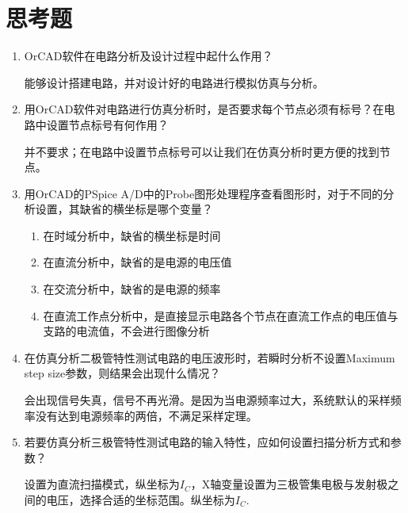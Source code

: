 \documentclass{../source/Experiment}
\begin{document}
    \section{思考题}
            \begin{enumerate}
                \item OrCAD软件在电路分析及设计过程中起什么作用？\par
                能够设计搭建电路，并对设计好的电路进行模拟仿真与分析。
                \item 用OrCAD软件对电路进行仿真分析时，是否要求每个节点必须有标号？在电路中设置节点标号有何作用？\par
                并不要求；在电路中设置节点标号可以让我们在仿真分析时更方便的找到节点。
                \item 用OrCAD的PSpice A/D中的Probe图形处理程序查看图形时，对于不同的分析设置，其缺省的横坐标是哪个变量？\par
                    \begin{enumerate}
                        \item 在时域分析中，缺省的横坐标是时间
                        \item 在直流分析中，缺省的是电源的电压值
                        \item 在交流分析中，缺省的是电源的频率
                        \item 在直流工作点分析中，是直接显示电路各个节点在直流工作点的电压值与支路的电流值，不会进行图像分析
                    \end{enumerate}
                \item 在仿真分析二极管特性测试电路的电压波形时，若瞬时分析不设置Maximum step size参数，则结果会出现什么情况？\par
                会出现信号失真，信号不再光滑。是因为当电源频率过大，系统默认的采样频率没有达到电源频率的两倍，不满足采样定理。
                \item 若要仿真分析三极管特性测试电路的输入特性，应如何设置扫描分析方式和参数？\par
                设置为直流扫描模式，纵坐标为$I_C$，X轴变量设置为三极管集电极与发射极之间的电压，选择合适的坐标范围。纵坐标为$I_C$.
            \end{enumerate}
\end{document}
